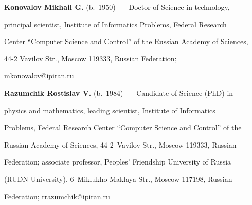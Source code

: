 




\Contr





\noindent


\textbf{Konovalov Mikhail G.} (b.\ 1950)~--- Doctor of Science in technology, 


principal scientist, Institute of Informatics Problems, Federal Research 


Center ``Computer Science and Control'' of the Russian Academy of Sciences, 


44-2 Vavilov Str., Moscow 119333, Russian Federation; 


\mbox{mkonovalov@ipiran.ru}





\vspace*{3pt}





\noindent


\textbf{Razumchik Rostislav V.} (b.\ 1984)~--- Candidate of Science (PhD) in 


physics and mathematics, leading scientist, Institute of Informatics 


Problems, Federal Research Center ``Computer Science and Control'' of the 


Russian Academy of Sciences, 44-2~Vavilov Str., Moscow 119333, Russian 


Federation; associate professor, Peoples' Friendship University of Russia 


(RUDN University), 6~Miklukho-Maklaya Str., Moscow 117198, Russian 


Federation; \mbox{rrazumchik@ipiran.ru}





\label{end\stat}





\renewcommand{\bibname}{\protect\rm Литература}       



